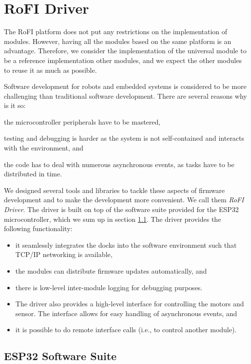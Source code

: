 \chapter{RoFI Driver}\label{chap:software}

The RoFI platform does not put any restrictions on the implementation of
modules. However, having all the modules based on the same platform is an
advantage. Therefore, we consider the implementation of the universal module to
be a reference implementation other modules, and we expect the other modules to
reuse it as much as possible.

Software development for robots and embedded systems is considered to be more
challenging than traditional software development. There are several reasons
why is it so:
\begin{enumerate*}
    \item the microcontroller peripherals have to be mastered,
    \item testing and debugging is harder as the system is not self-contained
    and interacts with the environment, and
    \item the code has to deal with numerous asynchronous events, as tasks have
    to be distributed in time.
\end{enumerate*}

We designed several tools and libraries to tackle these aspects of firmware
development and to make the development more convenient. We call them \emph{RoFI
Driver}. The driver is built on top of the software suite provided for the ESP32
microcontroller, which we sum up in section \ref{sec:hardware}. The driver
provides the following functionality:
\begin{itemize}
    \item it seamlessly integrates the docks into the software environment such
    that TCP/IP networking is available,
    \item the modules can distribute firmware updates automatically, and
    \item there is low-level inter-module logging for debugging purposes.
    \item The driver also provides a high-level interface for controlling the
    motors and sensor. The interface allows for easy handling of asynchronous
    events, and
    \item it is possible to do remote interface calls (i.e., to control another
    module).
\end{itemize}

\section{ESP32 Software Suite} \label{sec:hardware}

